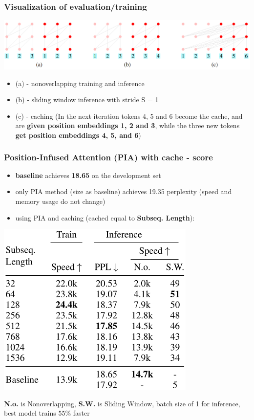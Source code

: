 \documentclass{beamer}
\begin{document}
\begin{frame}
    \frametitle{Visualization of evaluation/training}
    \begin{center}
        \includegraphics[scale=0.30]{img/shortformer_window_with_cache.png}
    \end{center}
    \begin{itemize}
        \item (a) - nonoverlapping training and inference
        \item (b) - sliding window inference with stride S = 1
        \item (c) - caching (In the next iteration tokens 4, 5 and 6 become the cache, and are \textbf{given position embeddings 1, 2 and 3}, while the three new tokens \textbf{get position embeddings 4, 5, and 6})
    \end{itemize}
\end{frame}

\begin{frame}
    \frametitle{Position-Infused Attention (PIA) with cache - score}
    \begin{center}
        \begin{itemize}
            \item \textbf{baseline} achieves \textbf{18.65} on the development set
            \item only PIA method (size as baseline) achieves 19.35 perplexity (speed and memory usage do not change)
            \item using PIA and caching (cached equal to \textbf{Subseq. Length}):
        \end{itemize}
        \includegraphics[scale=0.36]{img/shortformer_pia_score.png}

        \tiny{\textbf{N.o.} is Nonoverlapping, \textbf{S.W.} is Sliding Window, batch size of 1 for inference, best model trains
55\% faster}
    \end{center}
\end{frame}
\end{document}
